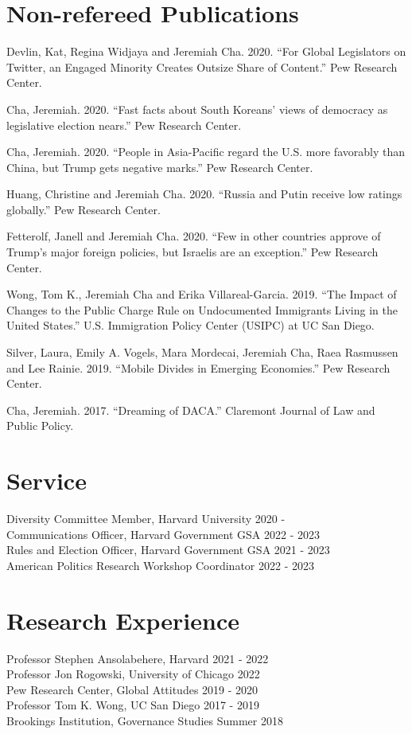 \documentclass[margin, line]{res}
\begin{document}
\begin{resume}
\section{Non-refereed Publications}
\begin{etaremune}
	\item Devlin, Kat, Regina Widjaya and Jeremiah Cha. 2020. ``For Global Legislators on Twitter, an Engaged Minority Creates Outsize Share of Content.'' Pew Research Center.
	\item Cha, Jeremiah. 2020. ``Fast facts about South Koreans’ views of democracy as legislative election nears.'' Pew Research Center.
	\item Cha, Jeremiah. 2020. ``People in Asia-Pacific regard the U.S. more favorably than China, but Trump gets negative marks.'' Pew Research Center.
	\item Huang, Christine and Jeremiah Cha. 2020. ``Russia and Putin receive low ratings globally.'' Pew Research Center.
	\item Fetterolf, Janell and Jeremiah Cha. 2020. ``Few in other countries approve of Trump’s major foreign policies, but Israelis are an exception.'' Pew Research Center.
	\item Wong, Tom K., Jeremiah Cha and Erika Villareal-Garcia. 2019. ``The Impact of Changes to the Public Charge Rule on Undocumented Immigrants Living in the United States.'' U.S. Immigration Policy Center (USIPC) at UC San Diego.
	\item Silver, Laura, Emily A. Vogels, Mara Mordecai, Jeremiah Cha, Raea Rasmussen and Lee Rainie. 2019. ``Mobile Divides in Emerging Economies.'' Pew Research Center.
	\item Cha, Jeremiah. 2017. ``Dreaming of DACA.'' Claremont Journal of Law and Public Policy.
\end{etaremune}

\section{Service}
Diversity Committee Member, Harvard University \hfill 2020 - \\
Communications Officer, Harvard Government GSA \hfill 2022 - 2023\\
Rules and Election Officer, Harvard Government GSA \hfill 2021 - 2023\\
American Politics Research Workshop Coordinator \hfill 2022 - 2023

\section{Research Experience}
Professor Stephen Ansolabehere, Harvard \hfill 2021 - 2022\\
Professor Jon Rogowski, University of Chicago \hfill 2022\\
Pew Research Center, Global Attitudes \hfill 2019 - 2020\\
Professor Tom K. Wong, UC San Diego \hfill 2017 - 2019\\
Brookings Institution, Governance Studies \hfill Summer 2018


\end{resume}
\end{document}
